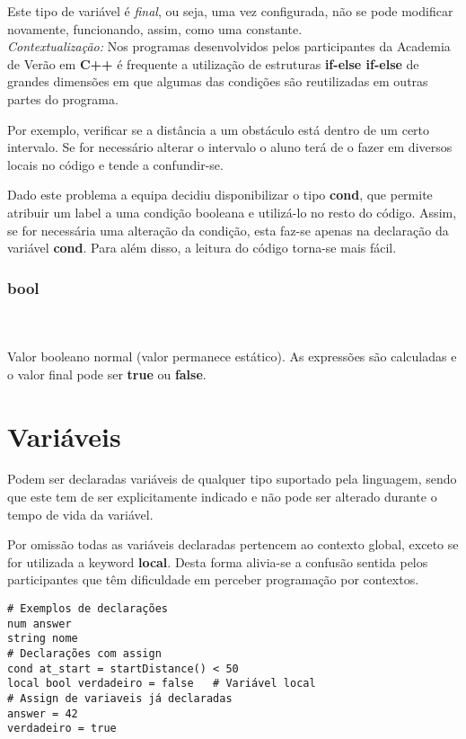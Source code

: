 \documentclass{report}
\begin{document}
    Este tipo de variável é \textit{final}, ou seja, uma vez configurada, não se pode modificar novamente, funcionando, assim, como uma constante. \\
    
    \textit{Contextualização:} 
Nos programas desenvolvidos pelos participantes da Academia de Verão em \textbf{C++} é frequente a utilização de estruturas \textbf{if-else if-else} de grandes dimensões em que algumas das condições são reutilizadas em outras partes do programa.

Por exemplo, verificar se a distância a um obstáculo está dentro de um certo intervalo. Se for necessário alterar o intervalo o aluno terá de o fazer em diversos locais no código e tende a confundir-se.

Dado este problema a equipa decidiu disponibilizar o tipo \textbf{cond}, que permite atribuir um label a uma condição booleana e utilizá-lo no resto do código. Assim, se for necessária uma alteração da condição, esta faz-se apenas na declaração da variável \textbf{cond}. Para além disso, a leitura do código torna-se mais fácil.

\subsubsection{bool}\\
    \\Valor booleano normal (valor permanece estático). As expressões são calculadas e o valor final pode ser \textbf{true} ou \textbf{false}.

\section{Variáveis}
Podem ser declaradas variáveis de qualquer tipo suportado pela linguagem, sendo que este tem de ser explicitamente indicado e não pode ser alterado durante o tempo de vida da variável.

Por omissão todas as variáveis declaradas pertencem ao contexto global, exceto se for utilizada a keyword \textbf{local}. Desta forma alivia-se a confusão sentida pelos participantes que têm dificuldade em perceber programação por contextos.

\begin{verbatim}
# Exemplos de declarações
num answer
string nome
# Declarações com assign
cond at_start = startDistance() < 50
local bool verdadeiro = false   # Variável local
# Assign de variaveis já declaradas
answer = 42
verdadeiro = true
\end{verbatim}
\end{document}
